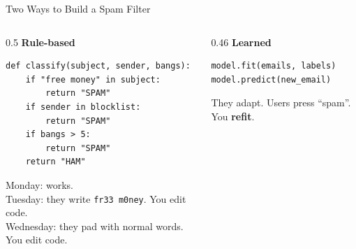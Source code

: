 \documentclass[aspectratio=169]{beamer}
\begin{document}
\begin{frame}[fragile,shrink=10]{Two Ways to Build a Spam Filter}
  \begin{columns}[T]
    \begin{column}{0.5\textwidth}
      \textbf{Rule-based}
      \begin{lstlisting}
def classify(subject, sender, bangs):
    if "free money" in subject:
        return "SPAM"
    if sender in blocklist:
        return "SPAM"
    if bangs > 5:
        return "SPAM"
    return "HAM"
      \end{lstlisting}
      \footnotesize
      Monday: works.\\
      Tuesday: they write \texttt{fr33 m0ney}. You edit code.\\
      Wednesday: they pad with normal words. You edit code.
    \end{column}
    \begin{column}{0.46\textwidth}
      \textbf{Learned}
      \begin{lstlisting}
model.fit(emails, labels)
model.predict(new_email)
      \end{lstlisting}
      \footnotesize
      They adapt. Users press ``spam''. You \textbf{refit}.\\[6pt]
    \end{column}
  \end{columns}
  \vspace{0.3em}
\end{frame}
\end{document}
